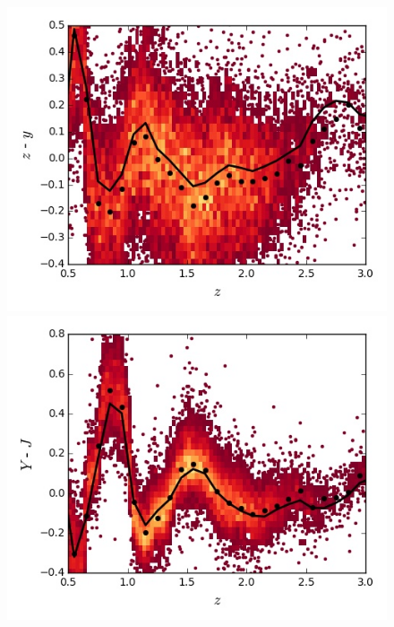 \begin{figure}
\begin{minipage}[b]{0.49\textwidth}
    \includegraphics[width=\textwidth]{figures/chapter06/sed_color_plots/zy.jpg}
  \end{minipage}
  \begin{minipage}[b]{0.49\textwidth}
    \includegraphics[width=\textwidth]{figures/chapter06/sed_color_plots/yj.jpg}
  \end{minipage} 
\end{figure}

